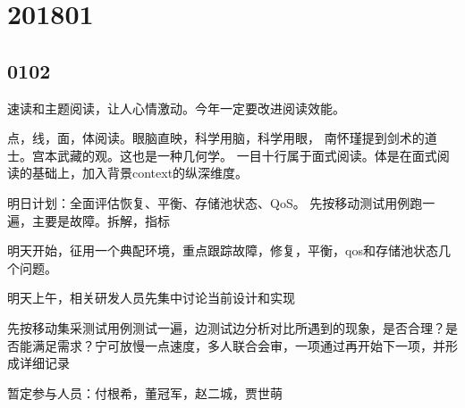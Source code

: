 \section{201801}

\subsection{0102}

速读和主题阅读，让人心情激动。今年一定要改进阅读效能。

点，线，面，体阅读。眼脑直映，科学用脑，科学用眼，
南怀瑾提到剑术的道士。宫本武藏的观。这也是一种几何学。
一目十行属于面式阅读。体是在面式阅读的基础上，加入背景context的纵深维度。

明日计划：全面评估恢复、平衡、存储池状态、QoS。
先按移动测试用例跑一遍，主要是故障。拆解，指标

明天开始，征用一个典配环境，重点跟踪故障，修复，平衡，qos和存储池状态几个问题。

\begin{compactenum}
\item 明天上午，相关研发人员先集中讨论当前设计和实现
\item 先按移动集采测试用例测试一遍，边测试边分析对比所遇到的现象，是否合理？是否能满足需求？宁可放慢一点速度，多人联合会审，一项通过再开始下一项，并形成详细记录
\end{compactenum}

暂定参与人员：付根希，董冠军，赵二城，贾世萌
